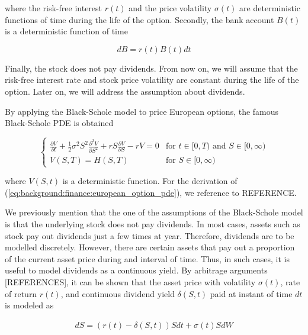 where the risk-free interest $r(t)$ and the price volatility $\sigma(t)$ are 
deterministic functions of time during the life of the option. Secondly, the 
bank account $B(t)$ is a deterministic function of time

\begin{equation}
  dB = r(t)B(t)dt
\end{equation}

Finally, the stock does not pay dividends. From now on, we will assume that 
the risk-free interest rate and stock price volatility are constant during the 
life of the option. Later on, we will address the assumption about dividends.

By applying the Black-Schole model to price European options, the famous Black-Schole 
PDE is obtained

\begin{equation}
  \begin{cases}
    \frac{\partial{V}}{\partial{t}} + \frac{1}{2}\sigma^{2} S^2 \frac{\partial^2{V}}{\partial{S^2}} + r S \frac{\partial{V}}{\partial{S}} - rV = 0 & \text{for $t\in[0,T)$ and $S\in[0, \infty)$} \\
    V(S, T) = H(S, T) & \text{for $S\in[0, \infty)$}
  \end{cases}
  \label{eq:background:finance:european_option_pde}
\end{equation}

where $V(S, t)$ is a deterministic function. For the derivation of 
(\ref{eq:background:finance:european_option_pde}), we reference to REFERENCE.

We previously mention that the one of the assumptions of the Black-Schole model is
that the underlying stock does not pay dividends. In most cases, assets such as stock
pay out dividends just a few times at year. Therefore, dividends are to be 
modelled discretely. However, there are certain assets that pay out a proportion
of the current asset price during and interval of time. Thus, in such cases, it is
useful to model dividends as a continuous yield. By arbitrage arguments [REFERENCES], it can be shown that the asset price with volatility $\sigma(t)$, rate of return $r(t)$,
and continuous dividend yield $\delta(S,t)$ paid at instant of time $dt$ is modeled as

\begin{align}
  dS = (r(t) - \delta(S, t))Sdt + \sigma(t) S dW
  \label{eq:background:finance:bs_price_model_with_dividends}
\end{align}


